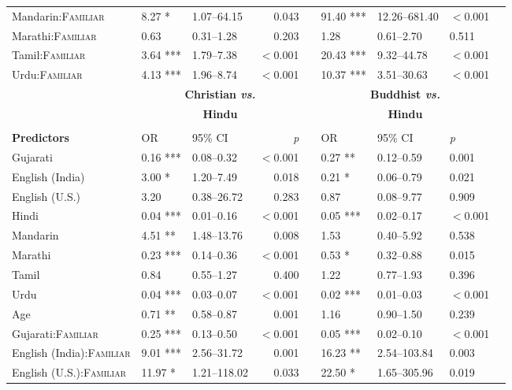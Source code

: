 \begin{table}[ht]
\begin{threeparttable}
\begin{tabular}{lllrllllr}
Mandarin:\textsc{Familiar} & 8.27 * & 1.07--64.15 & 0.043 &  & 91.40 *** & 12.26--681.40 & $<$0.001 \\ 
Marathi:\textsc{Familiar} & 0.63 & 0.31--1.28 & 0.203 &  & 1.28 & 0.61--2.70 & 0.511 \\ 
Tamil:\textsc{Familiar} & 3.64 *** & 1.79--7.38 & $<$0.001 &  & 20.43 *** & 9.32--44.78 & $<$0.001 \\ 
Urdu:\textsc{Familiar} & 4.13 *** & 1.96--8.74 & $<$0.001 &  & 10.37 *** & 3.51--30.63 & $<$0.001 \\ 
\midrule
& \multicolumn{3}{c}{\textbf{Christian \textit{vs.}}} & &
\multicolumn{3}{c}{\textbf{Buddhist \textit{vs.}}}\\

& \multicolumn{3}{c}{\textbf{Hindu}\tnote{a}} & & \multicolumn{3}{c}{\textbf{Hindu}\tnote{a}}\\
\cline{2-4} \cline{6-8} \\[-.75em]
\textbf{Predictors} & OR & 95\% CI & \textit{p} & & OR & 95\% CI & \textit{p} \\ 
\midrule
Gujarati & 0.16 *** & 0.08--0.32 & $<$0.001 &  & 0.27 ** & 0.12--0.59 & 0.001 \\ 
English (India) & 3.00 * & 1.20--7.49 & 0.018 &  & 0.21 * & 0.06--0.79 & 0.021 \\ 
English (U.S.) & 3.20 & 0.38--26.72 & 0.283 &  & 0.87 & 0.08--9.77 & 0.909 \\ 
Hindi & 0.04 *** & 0.01--0.16 & $<$0.001 &  & 0.05 *** & 0.02--0.17 & $<$0.001 \\ 
Mandarin & 4.51 ** & 1.48--13.76 & 0.008 &  & 1.53 & 0.40--5.92 & 0.538 \\ 
Marathi & 0.23 *** & 0.14--0.36 & $<$0.001 &  & 0.53 * & 0.32--0.88 & 0.015 \\ 
Tamil & 0.84 & 0.55--1.27 & 0.400 &  & 1.22 & 0.77--1.93 & 0.396 \\ 
Urdu & 0.04 *** & 0.03--0.07 & $<$0.001 &  & 0.02 *** & 0.01--0.03 & $<$0.001 \\ 
Age\tnote{b} & 0.71 ** & 0.58--0.87 & 0.001 &  & 1.16 & 0.90--1.50 & 0.239 \\ Gujarati:\textsc{Familiar} & 0.25 *** & 0.13--0.50 & $<$0.001 &  & 0.05 *** & 0.02--0.10 & $<$0.001 \\ 
English (India):\textsc{Familiar} & 9.01 *** & 2.56--31.72 & 0.001 &  & 16.23 ** & 2.54--103.84 & 0.003 \\ 
English (U.S.):\textsc{Familiar} & 11.97 * & 1.21--118.02 & 0.033 &  & 22.50 * & 1.65--305.96 & 0.019 \\ 

\end{tabular}
\end{threeparttable}
\end{table}
